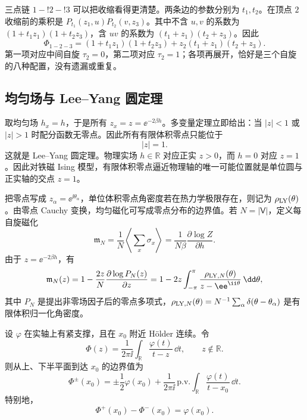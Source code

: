三点链 \(1\!-!2\!-!3\) 可以把收缩看得更清楚。两条边的参数分别为 \(t_1,t_2\)。在顶点 \(2\) 收缩前的乘积是
\(P_{t_1}(z_1,u)P_{t_2}(v,z_3)\)。其中不含 \(u,v\) 的系数为
\((1+t_1z_1)(1+t_2z_3)\)，含 \(uv\) 的系数为
\((t_1+z_1)(t_2+z_3)\)。因此
\[
 \Phi_{1-2-3}
 =(1+t_1z_1)(1+t_2z_3)
 +z_2(t_1+z_1)(t_2+z_3).
\]
第一项对应中间自旋 \(\tau_2=0\)，第二项对应 \(\tau_2=1\)；各项再展开，恰好是三个自旋的八种配置，没有遗漏或重复。

\subsection{均匀场与 Lee--Yang 圆定理}
\label{sec:phys-sm-circle-theorem}

取均匀场 \(h_x=h\)，于是所有 \(z_x=z=\ee^{-2\beta h}\)。多变量定理立即给出：当 \(|z|<1\) 或 \(|z|>1\) 时配分函数无零点。因此所有有限体积零点只能位于
\begin{equation}
 |z|=1.
 \label{eq:phys-sm-lee-yang-circle-general}
\end{equation}
这就是 Lee--Yang 圆定理。物理实场 \(h\in\mathbb R\) 对应正实 \(z>0\)，而 \(h=0\) 对应 \(z=1\)。因此对铁磁 Ising 模型，有限体积零点逼近物理轴的唯一可能位置就是单位圆与正实轴的交点 \(z=1\)。

把零点写成 \(z_\alpha=\ee^{\ii\theta_\alpha}\)，单位体积零点角密度若在热力学极限存在，则记为 \(\rho_{\rm LY}(\theta)\)。由零点 Cauchy 变换，均匀磁化可写成零点分布的边界值。若 \(N=|\mathsf V|\)，定义每自旋磁化
\begin{equation*}
 \mathfrak m_N=\frac{1}{N}\left\langle\sum_x\sigma_x\right\rangle
 =\frac{1}{N\beta}\frac{\partial\log Z}{\partial h}.
\end{equation*}
由于 \(z=\ee^{-2\beta h}\)，有
\begin{equation}
 \mathfrak m_N(z)=1-\frac{2z}{N}\frac{\partial\log P_N(z)}{\partial z}
 =1-2z\int_{-\pi}^{\pi}
 \frac{\rho_{{\rm LY},N}(\theta)}{z-\ee^{\ii\theta}}\,\dd\theta,
 \label{eq:phys-sm-magnetization-zero-transform}
\end{equation}
其中 \(P_N\) 是提出非零场因子后的零点多项式，\(\rho_{{\rm LY},N}(\theta)=N^{-1}\sum_\alpha\delta(\theta-\theta_\alpha)\) 是有限体积归一化角密度。

\begin{proposition}
设 \(\varphi\) 在实轴上有紧支撑，且在 \(x_0\) 附近 Hölder 连续。令
\[
\Phi(z)=\frac{1}{2\pi\ii}\int_{\mathbb R}
\frac{\varphi(t)}{t-z}\,\dd t,\qquad z\notin\mathbb R.
\]
则从上、下半平面到达 \(x_0\) 的边界值为
\begin{equation}
\Phi^\pm(x_0)
=\pm\frac12\varphi(x_0)
+\frac{1}{2\pi\ii}\,\mathrm{p.v.}\!\int_{\mathbb R}
\frac{\varphi(t)}{t-x_0}\,\dd t.
\label{eq:phys-sm-sokhotski-plemelj}
\end{equation}
特别地，
\begin{equation}
\Phi^+(x_0)-\Phi^-(x_0)=\varphi(x_0).
\label{eq:phys-sm-plemelj-jump}
\end{equation}
\end{proposition}

